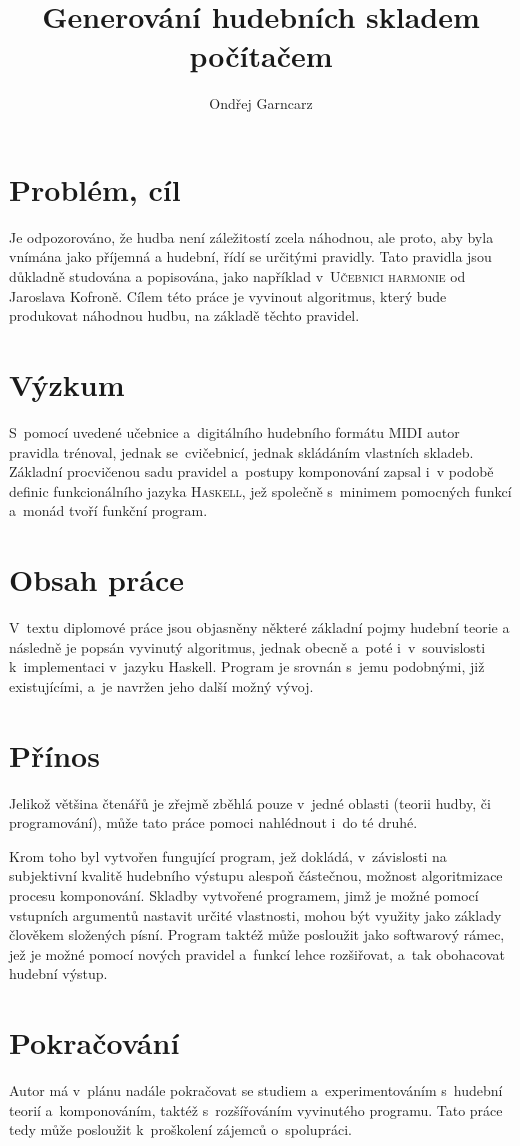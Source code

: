 \documentclass[a4paper, 12pt]{article}
\begin{document}
\author{Ondřej Garncarz}
\title{Generování hudebních skladem počítačem}
\date{}
\maketitle

\section*{Problém, cíl}

Je odpozorováno, že hudba není záležitostí zcela náhodnou, ale proto, aby byla vnímána jako příjemná a hudební, řídí se určitými pravidly. Tato pravidla jsou důkladně studována a popisována, jako například v~\textsc{Učebnici harmonie} od Jaroslava Kofroně. Cílem této práce je vyvinout algoritmus, který bude produkovat náhodnou hudbu, na základě těchto pravidel.


\section*{Výzkum}

S~pomocí uvedené učebnice a~digitálního hudebního formátu MIDI autor pravidla trénoval, jednak se~cvičebnicí, jednak skládáním vlastních skladeb. Základní procvičenou sadu pravidel a~postupy komponování zapsal i~v podobě definic funkcionálního jazyka \textsc{Haskell}, jež společně s~minimem pomocných funkcí a~monád tvoří funkční program.


\section*{Obsah práce}

V~textu diplomové práce jsou objasněny některé základní pojmy hudební teorie a následně je popsán vyvinutý algoritmus, jednak obecně a~poté i~v~souvislosti k~implementaci v~jazyku Haskell. Program je srovnán s~jemu podobnými, již existujícími, a~je navržen jeho další možný vývoj.


\section*{Přínos}

Jelikož většina čtenářů je zřejmě zběhlá pouze v~jedné oblasti (teorii hudby, či programování), může tato práce pomoci nahlédnout i~do té druhé.

Krom toho byl vytvořen fungující program, jež dokládá, v~závislosti na subjektivní kvalitě hudebního výstupu alespoň částečnou, možnost algoritmizace procesu komponování. Skladby vytvořené programem, jimž je možné pomocí vstupních argumentů nastavit určité vlastnosti, mohou být využity jako základy člověkem složených písní. Program taktéž může posloužit jako softwarový rámec, jež je možné pomocí nových pravidel a~funkcí lehce rozšiřovat, a~tak obohacovat hudební výstup.


\section*{Pokračování}

Autor má v~plánu nadále pokračovat se studiem a~experimentováním s~hudební teorií a~komponováním, taktéž s~rozšířováním vyvinutého programu. Tato práce tedy může posloužit k~proškolení zájemců o~spolupráci.
\end{document}
